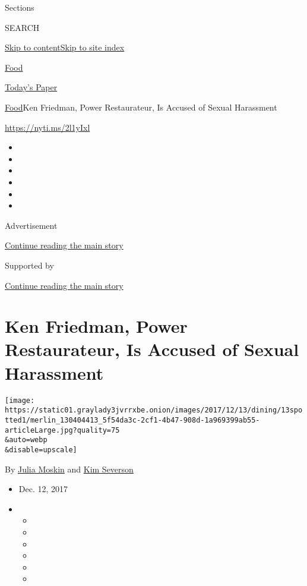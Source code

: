 Sections

SEARCH

\protect\hyperlink{site-content}{Skip to
content}\protect\hyperlink{site-index}{Skip to site index}

\href{https://www.nytimes3xbfgragh.onion/section/food}{Food}

\href{https://myaccount.nytimes3xbfgragh.onion/auth/login?response_type=cookie\&client_id=vi}{}

\href{https://www.nytimes3xbfgragh.onion/section/todayspaper}{Today's
Paper}

\href{/section/food}{Food}\textbar{}Ken Friedman, Power Restaurateur, Is
Accused of Sexual Harassment

\url{https://nyti.ms/2l1yIxl}

\begin{itemize}
\item
\item
\item
\item
\item
\item
\end{itemize}

Advertisement

\protect\hyperlink{after-top}{Continue reading the main story}

Supported by

\protect\hyperlink{after-sponsor}{Continue reading the main story}

\hypertarget{ken-friedman-power-restaurateur-is-accused-of-sexual-harassment}{%
\section{Ken Friedman, Power Restaurateur, Is Accused of Sexual
Harassment}\label{ken-friedman-power-restaurateur-is-accused-of-sexual-harassment}}

\texttt{[image: https://static01.graylady3jvrrxbe.onion/images/2017/12/13/dining/13spotted1/merlin\_130404413\_5f54da3c-2cf1-4b47-908d-1a969399ab55-articleLarge.jpg?quality=75\\\&auto=webp\\\&disable=upscale]}

By \href{https://www.nytimes3xbfgragh.onion/by/julia-moskin}{Julia
Moskin} and
\href{https://www.nytimes3xbfgragh.onion/by/kim-severson}{Kim Severson}

\begin{itemize}
\item
  Dec. 12, 2017
\item
  \begin{itemize}
  \item
  \item
  \item
  \item
  \item
  \item
  \end{itemize}
\end{itemize}

